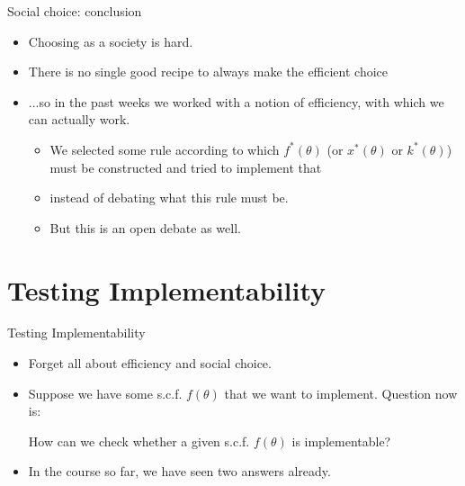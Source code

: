 \documentclass[english,10pt
,aspectratio=169
]{beamer}
\begin{document}
\begin{frame}{Social choice: conclusion}
	\begin{itemize}
		\item Choosing as a society is hard.
		\item There is no single good recipe to always make the efficient choice
		\item ...so in the past weeks we worked with a notion of efficiency, with which we can actually work.
		\begin{itemize}
			\item We selected some rule according to which $f^*(\theta)$ (or $x^*(\theta)$ or $k^*(\theta)$) must be constructed and tried to implement that
			\item instead of debating what this rule must be.
			\item But this is an open debate as well.
		\end{itemize}
	\end{itemize}
\end{frame}



\section{Testing Implementability}

\begin{frame}{Testing Implementability}
	\begin{itemize}
		\item Forget all about efficiency and social choice.
		\item Suppose we have some s.c.f. $f(\theta)$ that we want to implement. Question now is:
		\begin{exampleblock}{}
			How can we check whether a given s.c.f. $f(\theta)$ is implementable?
		\end{exampleblock} 
		\item In the course so far, we have seen two answers already.
	\end{itemize}
\end{frame}
\end{document}
